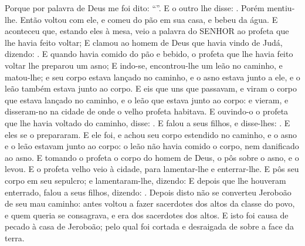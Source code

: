 {{  Porque por palavra de Deus me foi dito: \enquote{}}.
  E o outro lhe disse: . Porém mentiu-lhe.
  Então voltou com ele, e comeu do pão em sua casa, e bebeu da água.
  E aconteceu que, estando eles à mesa, veio a palavra do SENHOR ao profeta que lhe havia feito voltar;
  E clamou ao homem de Deus que havia vindo de Judá, dizendo: .
  E quando havia comido do pão e bebido, o profeta que lhe havia feito voltar lhe preparou um asno;
  E indo-se, encontrou-lhe um leão no caminho, e matou-lhe; e seu corpo estava lançado no caminho, e o asno estava junto a ele, e o leão também estava junto ao corpo.
  E eis que uns que passavam, e viram o corpo que estava lançado no caminho, e o leão que estava junto ao corpo: e vieram, e disseram-no na cidade de onde o velho profeta habitava.
  E ouvindo-o o profeta que lhe havia voltado do caminho, disse: .
  E falou a seus filhos, e disse-lhes: . E eles se o prepararam.
  E ele foi, e achou seu corpo estendido no caminho, e o asno e o leão estavam junto ao corpo: o leão não havia comido o corpo, nem danificado ao asno.
  E tomando o profeta o corpo do homem de Deus, o pôs sobre o asno, e o levou. E o profeta velho veio à cidade, para lamentar-lhe e enterrar-lhe.
  E pôs seu corpo em seu sepulcro; e lamentaram-lhe, dizendo: 
  E depois que lhe houveram enterrado, falou a seus filhos, dizendo: .
  Depois disto não se converteu Jeroboão de seu mau caminho: antes voltou a fazer sacerdotes dos altos da classe do povo, e quem queria se consagrava, e era dos sacerdotes dos altos.
  E isto foi causa de pecado à casa de Jeroboão; pelo qual foi cortada e desraigada de sobre a face da terra.
\par }

